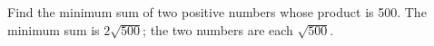 {Find the minimum sum of two positive numbers whose product is 500.
}
{The minimum sum is $2\sqrt{500}$; the two numbers are each $\sqrt{500}$.
}

